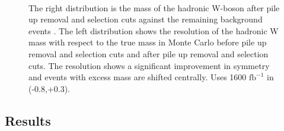 \begin{figure}

\centering
    \begin{minipage}{0.49\textwidth}
       \centering
   
   
    \end{minipage}\hfill
    \begin{minipage}{0.49\textwidth}
        \centering
     \end{minipage}\\
     \caption{The right distribution is the mass of the hadronic W-boson after pile up removal and selection cuts against the remaining background events . The left distribution shows the resolution of the hadronic W mass with respect to the true mass in Monte Carlo before pile up removal and selection cuts and after pile up removal and selection cuts. The resolution shows a significant improvement in symmetry and events with excess mass are shifted centrally.  Uses 1600 $\text{fb}^{-1}$ in (-0.8,+0.3). 
}
\label{fig:money}
\end{figure}

\subsection{Results}
\label{subsec:wmass}

